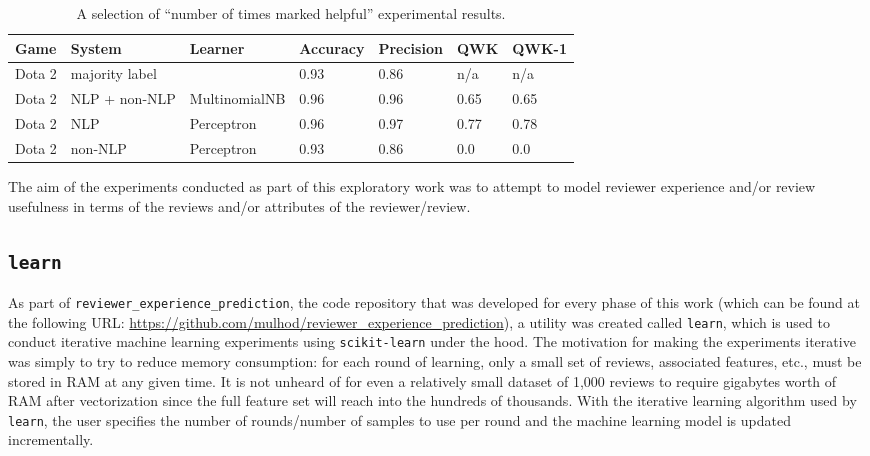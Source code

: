 \documentclass[9pt]{article}
\begin{document}
\begin{table*}[htbp]
\label{tab:hours_experiment_results}
\centering
\begin{tabular}{*{7}{l}}
\hline \bf Game & \bf System & \bf Learner & \bf Accuracy & \bf Precision & \bf QWK & \bf QWK-1 \\ \hline
Dota 2 & majority label &  & 0.93 & 0.86 & n/a & n/a \\
Dota 2 & NLP + non-NLP & MultinomialNB & 0.96 & 0.96 & 0.65 & 0.65 \\
Dota 2 & NLP & Perceptron & 0.96 & 0.97 & 0.77 & 0.78 \\
Dota 2 & non-NLP & Perceptron & 0.93 & 0.86 & 0.0 & 0.0 \\ \hline
\end{tabular}
\caption{A selection of ``number of times marked helpful'' experimental results.}
\end{table*}

The aim of the experiments conducted as part of this exploratory work was to attempt to model reviewer experience and/or review usefulness in terms of the reviews and/or attributes of the reviewer/review.

\subsection{{\tt learn}}
\label{ssec:learn}

As part of {\tt reviewer\_experience\_prediction}, the code repository that was developed for every phase of this work (which can be found at the following URL: \url{https://github.com/mulhod/reviewer_experience_prediction}), a utility was created called {\tt learn}, which is used to conduct iterative machine learning experiments using {\tt scikit-learn} under the hood. The motivation for making the experiments iterative was simply to try to reduce memory consumption: for each round of learning, only a small set of reviews, associated features, etc., must be stored in RAM at any given time. It is not unheard of for even a relatively small dataset of 1,000 reviews to require gigabytes worth of RAM after vectorization since the full feature set will reach into the hundreds of thousands. With the iterative learning algorithm used by {\tt learn}, the user specifies the number of rounds/number of samples to use per round and the machine learning model is updated incrementally.
\end{document}

